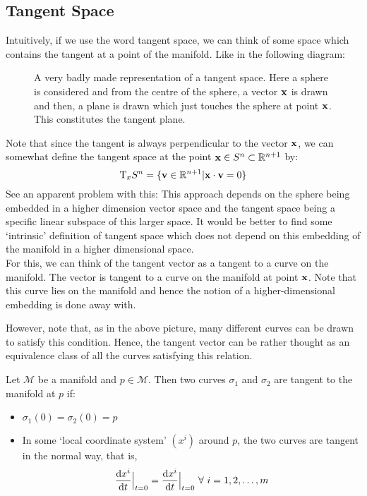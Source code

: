 \subsection{Tangent Space}
Intuitively, if we use the word tangent space, we can think of some space which contains the tangent at a point of the manifold. Like in the following diagram: 
\begin{figure}[H]
  \centering 
  
  \caption{A very badly made representation of a tangent space. Here a sphere is considered and from the centre of the sphere, a vector $\boldsymbol{\mathbf{x}}$ is drawn and then, a plane is drawn which just touches the sphere at point $\boldsymbol{\mathbf{x}}$. This constitutes the tangent plane. }
\end{figure}
\noindent
Note that since the tangent is always perpendicular to the vector $\boldsymbol{\mathbf{x}}$, we can somewhat define the tangent space at the point $\boldsymbol{\mathbf{x}}\in S^n \subset \mathbb{R}^{n+1}$ by: $$\mathrm{T}_{x}S^n = \{\boldsymbol{\mathbf{v}}\in \mathbb{R}^{n+1}| \boldsymbol{\mathbf{x}}\cdot \boldsymbol{\mathbf{v}} = 0\}$$
See an apparent problem with this: This approach depends on the sphere being embedded in a higher dimension vector space and the tangent space being a specific linear subspace of this larger space. It would be better to find some `intrinsic' definition of tangent space which does not depend on this embedding of the manifold in a higher dimensional space.\\[0.3cm]
For this, we can think of the tangent vector as a tangent to a curve on the manifold. The vector is tangent to a curve on the manifold at point $\boldsymbol{\mathbf{x}}$. Note that this curve lies on the manifold and hence the notion of a higher-dimensional embedding is done away with. 
\begin{figure}[H]
  \centering
  
\end{figure}
\noindent
However, note that, as in the above picture, many different curves can be drawn to satisfy this condition. Hence, the tangent vector can be rather thought as an equivalence class of all the curves satisfying this relation. 
\begin{definition}[Tangent]
  Let $\mathcal{M}$ be a manifold and $p\in \mathcal{M}$. Then two curves $\sigma_1$ and $\sigma_2$ are tangent to the manifold at $p$ if:
  \begin{itemize}
    \item $\sigma_1(0) = \sigma_2(0) = p$
    \item In some `local coordinate system' $(x^i)$ around $p$, the two curves are tangent in the normal way, that is, 
    $$\dv{x^i}{t}(\sigma_1(t))\Big|_{t=0} =\dv{x^i}{t}(\sigma_2(t))\Big|_{t=0}  \ \forall \ i = 1,2,\ldots,m$$
  \end{itemize}
  
\end{definition}
